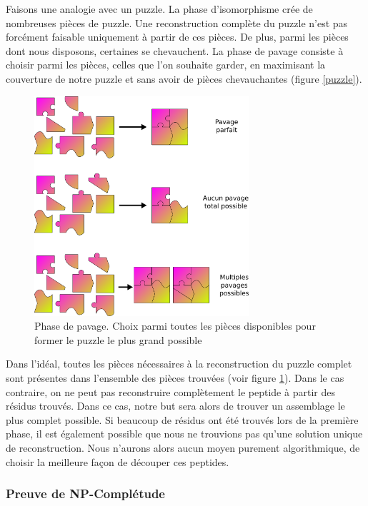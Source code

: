 Faisons une analogie avec un puzzle. La phase d'isomorphisme crée de nombreuses pièces de puzzle.
Une reconstruction complète du puzzle n'est pas forcément faisable uniquement à partir de ces pièces.
De plus, parmi les pièces dont nous disposons, certaines se chevauchent.
La phase de pavage consiste à choisir parmi les pièces, celles que l'on souhaite garder, en maximisant la couverture de notre puzzle et sans avoir de pièces chevauchantes (figure \ref{puzzle}).

\begin{figure}[!ht]
  \begin{center}
    \includegraphics[width=300px]{Figures/s2m/pavage/couvertures.png}
    \caption{\label{puzzle_covs}Phase de pavage.
    Choix parmi toutes les pièces disponibles pour former le puzzle le plus grand possible}
  \end{center}
\end{figure}

Dans l'idéal, toutes les pièces nécessaires à la reconstruction du puzzle complet sont présentes dans l'ensemble des pièces trouvées (voir figure \ref{puzzle_covs}).
Dans le cas contraire, on ne peut pas reconstruire complètement le peptide à partir des résidus trouvés.
Dans ce cas, notre but sera alors de trouver un assemblage le plus complet possible.
Si beaucoup de résidus ont été trouvés lors de la première phase, il est également possible que nous ne trouvions pas qu'une solution unique de reconstruction.
Nous n'aurons alors aucun moyen purement algorithmique, de choisir la meilleure façon de découper ces peptides.




\subsubsection{Preuve de NP-Complétude}

